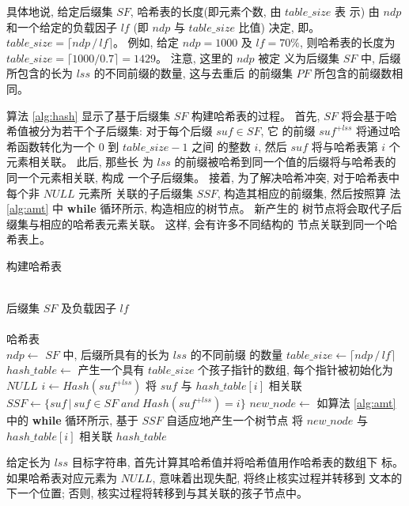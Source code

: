 具体地说, 给定后缀集 $SF$, 哈希表的长度(即元素个数, 由 $table\_size$ 表
示) 由 $ndp$ 和一个给定的负载因子 $lf$
(即 $ndp$ 与 $table\_size$ 比值) 决定, 即。
$table\_size = \lceil ndp\,/\,lf \rceil$。 例如, 给定 $ndp =
1000$ 及 $lf = 70\%$, 则哈希表的长度为
$table\_size = \lceil 1000/0.7 \rceil = 1429$。 注意, 这里的 $ndp$ 被定
义为后缀集 $SF$ 中, 后缀所包含的长为 $lss$ 的不同前缀的数量, 这与去重后
的前缀集 $PF$ 所包含的前缀数相同。

算法 \ref{alg:hash} 显示了基于后缀集 $SF$ 构建哈希表的过程。  首先,
$SF$ 将会基于哈希值被分为若干个子后缀集: 对于每个后缀 $suf \in SF$, 它
的前缀 $suf^{+lss}$ 将通过哈希函数转化为一个 0 到 $table\_size-1$ 之间
的整数 $i$, 然后 $suf$ 将与哈希表第 $i$ 个元素相关联。 此后, 那些长
为 $lss$ 的前缀被哈希到同一个值的后缀将与哈希表的同一个元素相关联, 构成
一个子后缀集。 接着, 为了解决哈希冲突, 对于哈希表中每个非 $NULL$ 元素所
关联的子后缀集 $SSF$, 构造其相应的前缀集, 然后按照算
法 \ref{alg:amt} 中 \textbf{while} 循环所示, 构造相应的树节点。 新产生的
树节点将会取代子后缀集与相应的哈希表元素关联。 这样, 会有许多不同结构的
节点关联到同一个哈希表上。

\begin{algorithm}
  \caption{构建哈希表}\scriptsize
  \label{alg:hash}
  \begin{algorithmic}[1]
    \REQUIRE ~~\\
    后缀集 $SF$ 及负载因子 $lf$ \\
    \ENSURE ~~\\
    哈希表\\
    \STATE
    \STATE $ndp \leftarrow$ $SF$ 中, 后缀所具有的长为 $lss$ 的不同前缀
    的数量
    \STATE $table\_size \leftarrow \lceil ndp\,/\,lf \rceil$
    \STATE $hash\_table \leftarrow$ 产生一个具有
    $table\_size$ 个孩子指针的数组, 每个指针被初始化为 $NULL$
    \STATE
    \STATE $i \leftarrow Hash(suf^{+lss})$
    \STATE 将 $suf$ 与 $hash\_table[i]$ 相关联
    \ENDFOR
    \STATE
    \STATE $SSF \leftarrow \{suf\,|\,suf\in SF\; and\; Hash(suf^{+lss})=i\}$
    \STATE $new\_node \leftarrow$ 如算法 \ref{alg:amt} 中的
    \textbf{while} 循环所示, 基于 $SSF$ 自适应地产生一个树节点
    \STATE 将 $new\_node$ 与 $hash\_table[i]$ 相关联
    \ENDIF
    \ENDFOR
    \STATE
    \RETURN $hash\_table$
  \end{algorithmic}
\end{algorithm}

给定长为 $lss$ 目标字符串, 首先计算其哈希值并将哈希值用作哈希表的数组下
标。 如果哈希表对应元素为 $NULL$, 意味着出现失配, 将终止核实过程并转移到
文本的下一个位置; 否则, 核实过程将转移到与其关联的孩子节点中。

